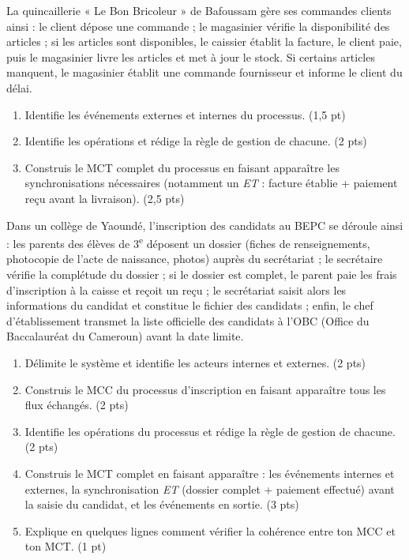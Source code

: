 \documentclass[11pt]{article}
\begin{document}
\begin{exercice}
La quincaillerie « Le Bon Bricoleur » de Bafoussam gère ses commandes clients ainsi : le client dépose une commande ; le magasinier vérifie la disponibilité des articles ; si les articles sont disponibles, le caissier établit la facture, le client paie, puis le magasinier livre les articles et met à jour le stock. Si certains articles manquent, le magasinier établit une commande fournisseur et informe le client du délai.
\begin{enumerate}
\item Identifie les événements externes et internes du processus. \hfill (1,5 pt)
\item Identifie les opérations et rédige la règle de gestion de chacune. \hfill (2 pts)
\item Construis le MCT complet du processus en faisant apparaître les synchronisations nécessaires (notamment un \emph{ET} : facture établie + paiement reçu avant la livraison). \hfill (2,5 pts)
\end{enumerate}
\end{exercice}

\begin{exercice}
Dans un collège de Yaoundé, l'inscription des candidats au BEPC se déroule ainsi : les parents des élèves de 3\textsuperscript{e} déposent un dossier (fiches de renseignements, photocopie de l'acte de naissance, photos) auprès du secrétariat ; le secrétaire vérifie la complétude du dossier ; si le dossier est complet, le parent paie les frais d'inscription à la caisse et reçoit un reçu ; le secrétariat saisit alors les informations du candidat et constitue le fichier des candidats ; enfin, le chef d'établissement transmet la liste officielle des candidats à l'OBC (Office du Baccalauréat du Cameroun) avant la date limite.
\begin{enumerate}
\item Délimite le système et identifie les acteurs internes et externes. \hfill (2 pts)
\item Construis le MCC du processus d'inscription en faisant apparaître tous les flux échangés. \hfill (2 pts)
\item Identifie les opérations du processus et rédige la règle de gestion de chacune. \hfill (2 pts)
\item Construis le MCT complet en faisant apparaître : les événements internes et externes, la synchronisation \emph{ET} (dossier complet + paiement effectué) avant la saisie du candidat, et les événements en sortie. \hfill (3 pts)
\item Explique en quelques lignes comment vérifier la cohérence entre ton MCC et ton MCT. \hfill (1 pt)
\end{enumerate}
\end{exercice}
\end{document}
